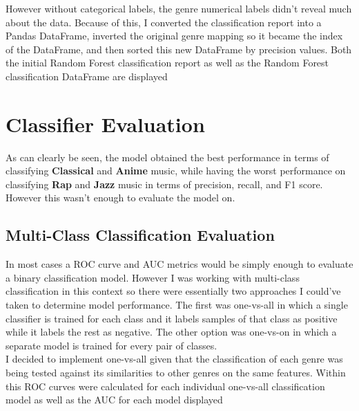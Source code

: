 \documentclass[12pt]{article}
\begin{document}
\noindent
However without categorical labels, the genre numerical labels didn't reveal much about the data. Because of this, I converted the classification report into a Pandas DataFrame, inverted the original genre mapping so it became the index of the DataFrame, and then sorted this new DataFrame by precision values. Both the initial Random Forest classification report as well as the Random Forest classification DataFrame are displayed

\newpage
\section{Classifier Evaluation}
As can clearly be seen, the model obtained the best performance in terms of classifying \textbf{Classical} and \textbf{Anime} music, while having the worst performance on classifying \textbf{Rap} and \textbf{Jazz} music in terms of precision, recall, and F1 score. However this wasn't enough to evaluate the model on. 

\subsection*{Multi-Class Classification Evaluation}
In most cases a ROC curve and AUC metrics would be simply enough to evaluate a binary classification model. However I was working with multi-class classification in this context so there were essentially two approaches I could've taken to determine model performance. The first was one-vs-all in which a single classifier is trained for each class and it labels samples of that class as positive while it labels the rest as negative. The other option was one-vs-on in which a separate model is trained for every pair of classes. \\

\noindent
I decided to implement one-vs-all given that the classification of each genre was being tested against its similarities to other genres on the same features. Within this ROC curves were calculated for each individual one-vs-all classification model as well as the AUC for each model displayed \\
\end{document}
